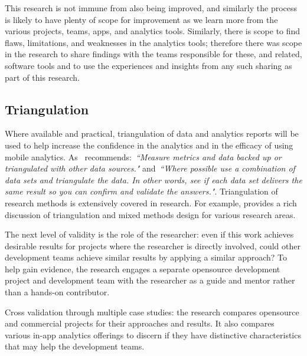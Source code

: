 This research is not immune from also being improved, and similarly the process is likely to have plenty of scope for improvement as we learn more from the various projects, teams, apps, and analytics tools. Similarly, there is scope to find flaws, limitations, and weaknesses in the analytics tools; therefore there was scope in the research to share findings with the teams responsible for these, and related, software tools and to use the experiences and insights from any such sharing as part of this research.


\subsection{Triangulation}
Where available and practical, triangulation %
of data and analytics reports will be used to help increase the confidence in the analytics and in the efficacy of using mobile analytics. As~\citep{marr2015bigdatabook} recommends:~\emph{``Measure metrics and data backed up or triangulated with other data sources."} and~\emph{``Where possible use a combination of data sets and triangulate the data. In other words, see if each data set delivers the same result so you can confirm and validate the answers."}. Triangulation of research methods is extensively covered in research. For example, \citep{fielding2012_triangulation_and_mixed_methods_designs} provides a rich discussion of triangulation and mixed methods design for various research areas. %

The next level of validity is the role of the researcher: even if this work achieves desirable results for projects where the researcher is directly involved, could other development teams achieve similar results by applying a similar approach? To help gain evidence, the research engages a separate opensource development project and development team with the researcher as a guide and mentor rather than a hands-on contributor.

Cross validation through multiple case studies: the research compares opensource and commercial projects for their approaches and results. It also compares various in-app analytics offerings to discern if they have distinctive characteristics that may help the development teams.


